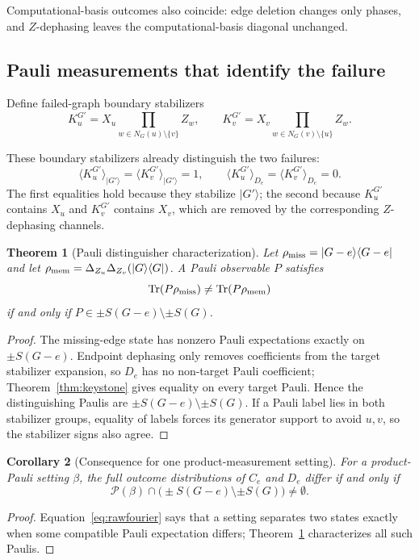 \documentclass[11pt]{article}
\newtheorem{theorem}{Theorem}[section]
\newtheorem{corollary}[theorem]{Corollary}
\theoremstyle{remark}
\newcommand{\Tr}{\operatorname{Tr}}
\begin{document}
Computational-basis outcomes also coincide: edge deletion changes only phases, and \(Z\)-dephasing leaves the computational-basis diagonal unchanged.

\subsection{Pauli measurements that identify the failure}
Define failed-graph boundary stabilizers
\[
K_u^{G'}=X_u\prod_{w\in N_G(u)\setminus\{v\}}Z_w,
\qquad
K_v^{G'}=X_v\prod_{w\in N_G(v)\setminus\{u\}}Z_w.
\]

These boundary stabilizers already distinguish the two failures:
\[
\langle K_u^{G'}\rangle_{|G'\rangle}=\langle K_v^{G'}\rangle_{|G'\rangle}=1,
\qquad
\langle K_u^{G'}\rangle_{D_e}=
\langle K_v^{G'}\rangle_{D_e}=0.
\]
The first equalities hold because they stabilize \(|G'\rangle\); the second because \(K_u^{G'}\) contains \(X_u\) and \(K_v^{G'}\) contains \(X_v\), which are removed by the corresponding \(Z\)-dephasing channels.

\begin{theorem}[Pauli distinguisher characterization]\label{thm:minimality}
Let $\rho_{\rm miss}=|G-e\rangle\langle G-e|$ and let
$\rho_{\rm mem}=\Delta_{Z_u}\Delta_{Z_v}(|G\rangle\langle G|)$.
A Pauli observable $P$ satisfies
\[
\Tr(P\rho_{\rm miss})\ne \Tr(P\rho_{\rm mem})
\]
if and only if $P\in \pm S(G-e)\setminus \pm S(G)$.
\end{theorem}

\begin{proof}
The missing-edge state has nonzero Pauli expectations exactly on $\pm S(G-e)$. Endpoint dephasing only removes coefficients from the target stabilizer expansion, so $D_e$ has no non-target Pauli coefficient; Theorem~\ref{thm:keystone} gives equality on every target Pauli. Hence the distinguishing Paulis are $\pm S(G-e)\setminus\pm S(G)$. If a Pauli label lies in both stabilizer groups, equality of labels forces its generator support to avoid $u,v$, so the stabilizer signs also agree.
\end{proof}

\begin{corollary}[Consequence for one product-measurement setting]\label{cor:rawcriterion}
For a product-Pauli setting $\beta$, the full outcome distributions of $C_e$ and $D_e$ differ if and only if
\[
\mathcal P(\beta)\cap\big(\pm S(G-e)\setminus\pm S(G)\big)\ne\emptyset.
\]
\end{corollary}
\begin{proof}
Equation~\eqref{eq:rawfourier} says that a setting separates two states exactly when some compatible Pauli expectation differs; Theorem~\ref{thm:minimality} characterizes all such Paulis.
\end{proof}
\end{document}
